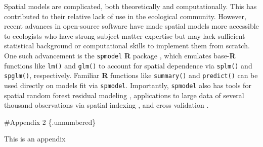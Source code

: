 \documentclass[
  letterpaper,
  DIV=11,
  numbers=noendperiod]{scrartcl}
\begin{document}
Spatial models are complicated, both theoretically and computationally.
This has contributed to their relative lack of use in the ecological
community. However, recent advances in open-source software have made
spatial models more accessible to ecologists who have strong subject
matter expertise but may lack sufficient statistical background or
computational skills to implement them from scratch. One such
advancement is the \texttt{spmodel} \textbf{R} package
\citep{dumelle2023spmodel}, which emulates base-\textbf{R} functions
like \texttt{lm()} and \texttt{glm()} to account for spatial dependence
via \texttt{splm()} and \texttt{spglm()}, respectively. Familiar
\textbf{R} functions like \texttt{summary()} and \texttt{predict()} can
be used directly on models fit via \texttt{spmodel}. Importantly,
\texttt{spmodel} also has tools for spatial random forest residual
modeling \citep{fox2020comparing}, applications to large data of several
thousand observations via spatial indexing \citep{ver2023indexing}, and
cross validation \citep{stone1974cross, roberts2017cross}.

\#Appendix 2 \{.unnumbered\}

This is an appendix
\end{document}
